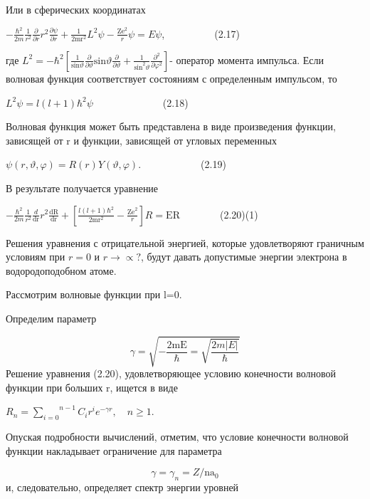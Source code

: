 \documentclass[a4paper,14pt, openany, twoside, draft]{extbook} %
\begin{document}
Или в сферических координатах

 $-\frac{\hbar ^2}{2m}\frac 1{r^2}\frac{\partial }{\partial r}r^2\frac{\partial \psi }{\partial r}+\frac 1{2{\text{mr}}^2}L^2\psi -\frac{{\text{Ze}}^2} r\psi =\mathit{E\psi }$,\ \ \ \ \ \ \ \ \ \ (2.17)

где  $L^2=-\hbar ^2\left[\frac 1{\text{sin}\vartheta }\frac{\partial }{\partial \vartheta }\text{sin}\vartheta \frac{\partial }{\partial \vartheta }+\frac 1{\text{sin}^2\vartheta }\frac{\partial ^2}{\partial \varphi ^2}\right]${}- оператор момента импульса. Если волновая функция соответствует состояниям с определенным импульсом, то

 $L^2\psi =l(l+1)\hbar ^2\psi $\ \ \ \ \ \ \ \ \ \ \ \ \ \ (2.18)

Волновая функция может быть представлена в виде произведения функции, зависящей от r и функции, зависящей от угловых переменных

 $\psi (r,\vartheta ,\varphi )=R(r)Y(\vartheta ,\varphi )$.\ \ \ \ \ \ \ \ \ \ \ \ (2.19)

В результате получается уравнение

 $-\frac{\hbar ^2}{2m}\frac 1{r^2}\frac d{{\text{dr}}}r^2\frac{{\text{dR}}}{{\text{dr}}}+\left[\frac{l(l+1)\hbar ^2}{2{\text{mr}}^2}-\frac{{\text{Ze}}^2} r\right]R={\text{ER}}$\ \ \ \ \ \ \ \ (2.20)(1)

Решения уравнения с отрицательной энергией, которые удовлетворяют граничным условиям при  $r=0$ и  $r\rightarrow \propto ?$, будут давать допустимые энергии электрона в водородоподобном атоме.

Рассмотрим волновые функции при l=0.

Определим параметр

\begin{equation*}
\gamma =\sqrt{-\frac{2{\text{mE}}}{\hbar }=\sqrt{\frac{2m|E|}{\hbar }}}
\end{equation*}
Решение уравнения (2.20), удовлетворяющее условию конечности волновой функции при больших r, ищется в виде

 $R_n=\overset{n-1}{\underset{i=0}{\sum }}C_ir^ie^{-\gamma r},\quad n\geq 1$.

Опуская подробности вычислений, отметим, что условие конечности волновой функции накладывает ограничение для параметра

\begin{equation*}
\gamma =\gamma _n=Z/{\text{na}}_0
\end{equation*}
и, следовательно, определяет спектр энергии уровней
\end{document}

